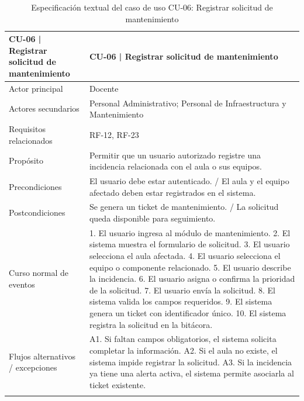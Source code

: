 \begingroup
\small
\begin{longtable}{|p{7.8cm}|p{7.8cm}|}
\hline
CU-06 | Registrar solicitud de mantenimiento & CU-06 | Registrar solicitud de mantenimiento \\ \hline
Actor principal & Docente \\ \hline
Actores secundarios & Personal Administrativo; Personal de Infraestructura y Mantenimiento \\ \hline
Requisitos relacionados & RF-12, RF-23 \\ \hline
Propósito & Permitir que un usuario autorizado registre una incidencia relacionada con el aula o sus equipos. \\ \hline
Precondiciones & El usuario debe estar autenticado. / El aula y el equipo afectado deben estar registrados en el sistema. \\ \hline
Postcondiciones & Se genera un ticket de mantenimiento. / La solicitud queda disponible para seguimiento. \\ \hline
Curso normal de eventos & 1. El usuario ingresa al módulo de mantenimiento. 2. El sistema muestra el formulario de solicitud. 3. El usuario selecciona el aula afectada. 4. El usuario selecciona el equipo o componente relacionado. 5. El usuario describe la incidencia. 6. El usuario asigna o confirma la prioridad de la solicitud. 7. El usuario envía la solicitud. 8. El sistema valida los campos requeridos. 9. El sistema genera un ticket con identificador único. 10. El sistema registra la solicitud en la bitácora. \\ \hline
Flujos alternativos / excepciones & A1. Si faltan campos obligatorios, el sistema solicita completar la información. A2. Si el aula no existe, el sistema impide registrar la solicitud. A3. Si la incidencia ya tiene una alerta activa, el sistema permite asociarla al ticket existente. \\ \hline
\caption{Especificación textual del caso de uso CU-06: Registrar solicitud de mantenimiento}
\end{longtable}
\endgroup

